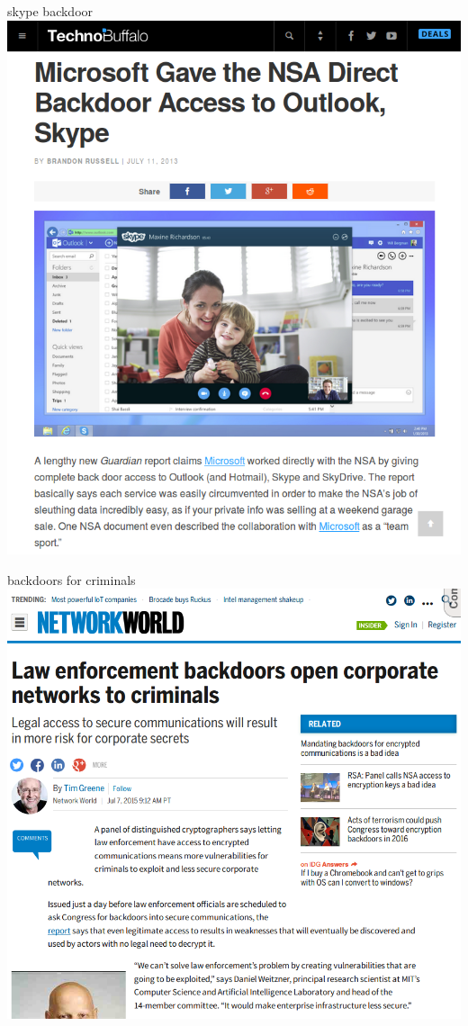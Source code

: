 \documentclass[11pt]{beamer}
\begin{document}
\begin{frame}{skype backdoor}
\includegraphics[scale=0.27]{skype.png}
\end{frame}

\begin{frame}{backdoors for criminals}
\includegraphics[scale=0.28]{backdoor_criminals.png}
\end{frame}
\end{document}
